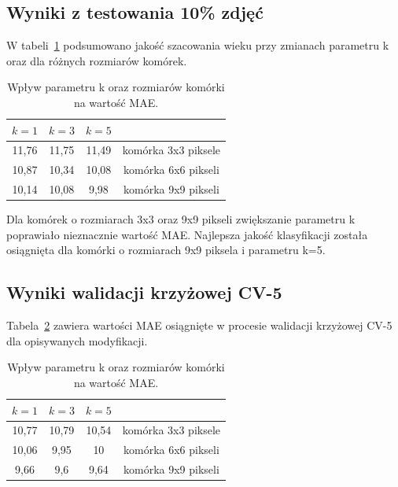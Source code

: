 \documentclass[a4paper,twoside,12pt]{book}
\begin{document}
    \subsection*{Wyniki z testowania 10\% zdjęć}
    W tabeli~\ref{tab.hogknn} podsumowano jakość szacowania wieku przy zmianach parametru k oraz dla różnych
    rozmiarów komórek.
    \begin{table}[]
        \centering
        \caption{Wpływ parametru k oraz rozmiarów komórki na wartość MAE.}
        \begin{tabular}{|c|c|c|c|}
            \hline
            $k=1$ & $k=3$ & $k=5$ &                     \\ \hline
            11,76 & 11,75 & 11,49 & komórka 3x3 piksele \\ \hline
            10,87 & 10,34 & 10,08 & komórka 6x6 pikseli \\ \hline
            10,14 & 10,08 & 9,98 & komórka 9x9 pikseli \\ \hline
        \end{tabular}
        \label{tab.hogknn}
    \end{table}
    Dla komórek o rozmiarach 3x3 oraz 9x9 pikseli zwiększanie parametru k poprawiało nieznacznie wartość MAE.
    Najlepsza jakość klasyfikacji została osiągnięta dla komórki o rozmiarach 9x9 piksela i parametru k=5.
    \subsection*{Wyniki walidacji krzyżowej CV-5}
    Tabela~\ref{tab.hogknncv} zawiera wartości MAE osiągnięte w procesie walidacji krzyżowej CV-5 dla opisywanych
    modyfikacji.
    \begin{table}[]
        \centering
        \caption{Wpływ parametru k oraz rozmiarów komórki na wartość MAE.}
        \begin{tabular}{|c|c|c|c|}
            \hline
            $k=1$ & $k=3$ & $k=5$  &                     \\ \hline
            10,77 & 10,79 & 10,54 & komórka 3x3 piksele \\ \hline
            10,06 & 9,95 & 10 & komórka 6x6 pikseli \\ \hline
            9,66 & 9,6 & 9,64 & komórka 9x9 pikseli \\ \hline
        \end{tabular}
        \label{tab.hogknncv}
    \end{table}
\end{document}
